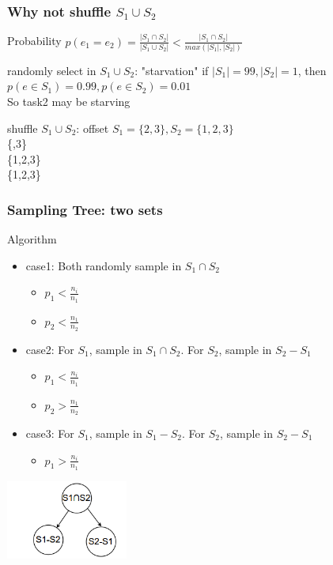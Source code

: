 \documentclass[notheorems, aspectratio=54]{beamer}
\begin{document}
\begin{frame}
    \frametitle{Why not shuffle $S_1 \cup S_2$}
    \begin{block} {Probability}
        $p(e_1=e_2) = \frac{|S_1\cap S_2|}{|S_1 \cup S_2|} < \frac{|S_1\cap S_2|}{max(|S_1|,|S_2|)}$
    \end{block}
    \begin{block} {randomly select in $S_1\cup S_2$: "starvation"}
        if $|S_1| = 99, |S_2| = 1$,
        then $p(e \in S_1) = 0.99, p(e \in S_2) = 0.01$ \\
        So task2 may be starving
    \end{block}
    \begin{block} {shuffle $S_1\cup S_2$: offset}
        $S_1 = \{2,3\}, S_2 = \{1,2,3\}$\\
        \{\space {},3\}\\
        \{1,2,3\} \\
        \{1,2,3\}\\
    \end{block}
\end{frame}

\begin{frame}
    \frametitle{Sampling Tree: two sets}
    \begin{block} {Algorithm}
        \begin{itemize}
            \item case1: Both randomly sample in $S_1\cap S_2$
            \begin{itemize}
                \item $p_1 < \frac{n_i}{n_1}$
                \item $p_2 < \frac{n_1}{n_2}$
            \end{itemize}
            \item case2: For $S_1$, sample in $S_1\cap S_2$. For $S_2$, sample in $S_2-S_1$
            \begin{itemize}
                \item $p_1 < \frac{n_i}{n_1}$
                \item $p_2 > \frac{n_1}{n_2}$
            \end{itemize}
            \item case3: For $S_1$, sample in $S_1 - S_2$. For $S_2$, sample in $S_2-S_1$
            \begin{itemize}
                \item $p_1 > \frac{n_i}{n_1}$
            \end{itemize}
        \end{itemize}
    \end{block}
    \centering
    \includegraphics[width=4cm]{global_img_dir/SamplingTree2.png}
\end{frame}
\end{document}

